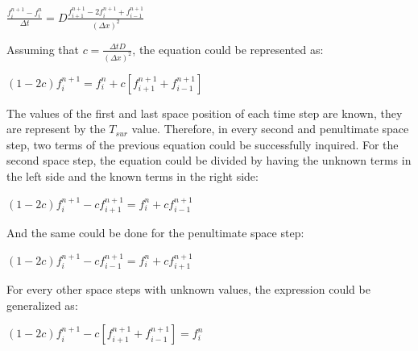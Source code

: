 \documentclass[12pt]{article}
\begin{document}
\begin{center}
\Large
$
\frac{f_i^{n + 1} - f_i^{n}}{\Delta t} = D \frac{f_{i + 1}^{n + 1} - 2f_{i}^{n + 1} + f_{i - 1}^{n + 1}}{(\Delta x)^2} 
$
\end{center}

\par Assuming that $c = \frac{\Delta t D}{(\Delta x)^2}$, the equation could be represented as:

\begin{center}
\Large
$
(1 - 2c)f_i^{n + 1} = f_i^n + c \left[f_{i + 1}^{n + 1} + f_{i - 1}^{n + 1}\right]
$
\end{center}

\par The values of the first and last space position of each time step are known, they are represent by the $T_{sur}$ value. Therefore, in every second and penultimate space step, two terms of the previous equation could be successfully inquired. For the second space step, the equation could be divided by having the unknown terms in the left side and the known terms in the right side:

\begin{center}
\Large
$
(1 - 2c)f_i^{n + 1} - c f_{i + 1}^{n + 1} = f_i^n + c f_{i - 1}^{n + 1}
$
\end{center}

\par And the same could be done for the penultimate space step:

\begin{center}
\Large
$
(1 - 2c)f_i^{n + 1} - c f_{i - 1}^{n + 1} = f_i^n + c f_{i + 1}^{n + 1}
$
\end{center}

\par For every other space steps with unknown values, the expression could be generalized as:

\begin{center}
\Large
$
(1 - 2c)f_i^{n + 1} - c \left[f_{i + 1}^{n + 1} + f_{i - 1}^{n + 1}\right] = f_i^n 
$
\end{center}
\end{document}
